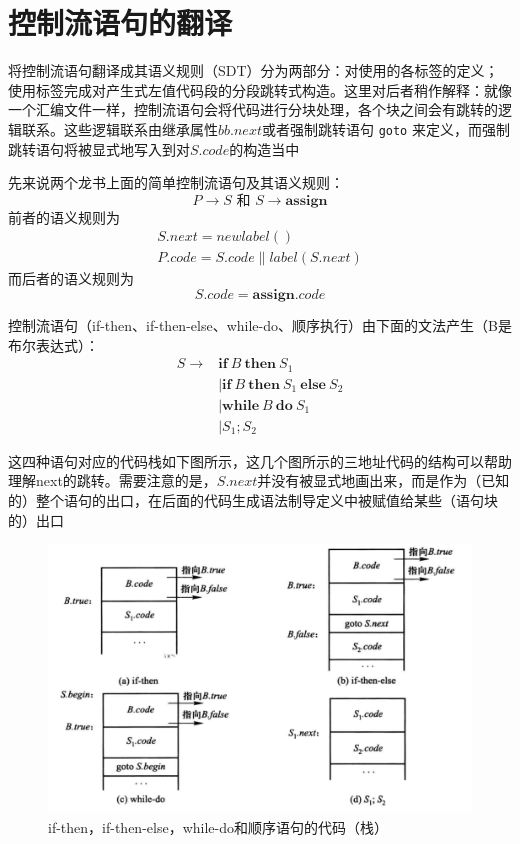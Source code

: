 \documentclass[]{report}
\begin{document}
	\section{控制流语句的翻译}
			将控制流语句翻译成其语义规则（SDT）分为两部分：对使用的各标签的定义；使用标签完成对产生式左值代码段的分段跳转式构造。这里对后者稍作解释：就像一个汇编文件一样，控制流语句会将代码进行分块处理，各个块之间会有跳转的逻辑联系。这些逻辑联系由继承属性$bb.next$或者强制跳转语句 \verb|goto| 来定义，而强制跳转语句将被显式地写入到对$S.code$的构造当中\par
			先来说两个龙书上面的简单控制流语句及其语义规则：
			\[P\to S\mbox{ 和 }S\to\mathbf{assign}\]
			前者的语义规则为
			\[\begin{gathered}
				S.next=newlabel()\\
				P.code = S.code\parallel label(S.next)
			\end{gathered}\]
			而后者的语义规则为
			\[S.code=\mathbf{assign}.code\]\par
			控制流语句（if-then、if-then-else、while-do、顺序执行）由下面的文法产生（B是布尔表达式）：
			\[\begin{aligned}
				S\to
				&\mathbf{if}\ B\ \mathbf{then}\ S_1\\
				&\mid\mathbf{if}\ B\ \mathbf{then}\ S_1\ \mathbf{else}\ S_2\\
				&\mid\mathbf{while}\ B\ \mathbf{do}\ S_1\\
				&\mid S_1;S_2
			\end{aligned}\]\par
			这四种语句对应的代码栈如下图所示，这几个图所示的三地址代码的结构可以帮助理解next的跳转。需要注意的是，$S.next$并没有被显式地画出来，而是作为（已知的）整个语句的出口，在后面的代码生成语法制导定义中被赋值给某些（语句块的）出口
			\begin{figure}[ht!]
				\centering
				\begin{minipage}{40em}
					\centering
					\includegraphics[scale = 0.4]{images/Bool_Expression_If_Code.png}
					\caption{if-then，if-then-else，while-do和顺序语句的代码（栈）}
				\end{minipage}
			\end{figure}
\end{document}
